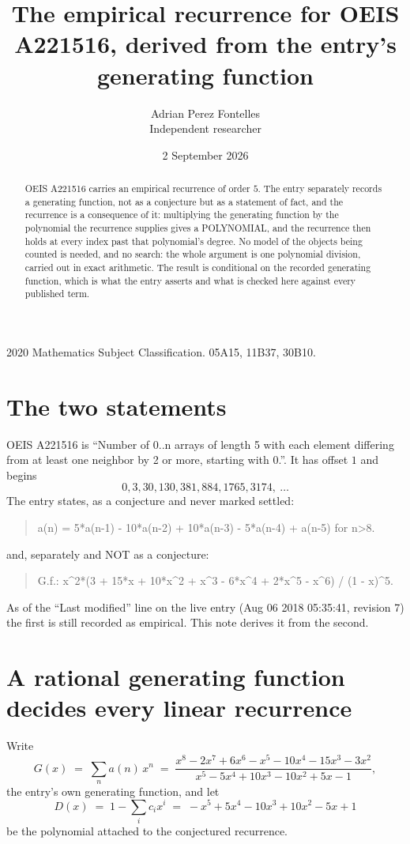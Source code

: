 \documentclass[11pt,a4paper]{article}
\title{The empirical recurrence for OEIS A221516, derived from the entry's generating function}
\author{Adrian Perez Fontelles\\ \small Independent researcher}
\date{2 September 2026}
\theoremstyle{plain}
\theoremstyle{definition}
\begin{document}
\maketitle

\begin{abstract}
OEIS A221516 carries an empirical recurrence of order $5$. The entry separately records a
generating function, not as a conjecture but as a statement of fact, and the recurrence is a
consequence of it: multiplying the generating function by the polynomial the recurrence
supplies gives a POLYNOMIAL, and the recurrence then holds at every index past that
polynomial's degree. No model of the objects being counted is needed, and no search: the
whole argument is one polynomial division, carried out in exact arithmetic. The result is
conditional on the recorded generating function, which is what the entry asserts and what is
checked here against every published term.
\end{abstract}

\noindent\small 2020 Mathematics Subject Classification. 05A15, 11B37, 30B10.\normalsize

\section{The two statements}

OEIS A221516 is ``Number of 0..n arrays of length 5 with each element differing from at least one neighbor by 2 or more, starting with 0.''. It has offset $1$ and begins
\[
0, 3, 30, 130, 381, 884, 1765, 3174,\ \dots
\]
The entry states, as a conjecture and never marked settled:
\begin{quote}
a(n) = 5*a(n-1) - 10*a(n-2) + 10*a(n-3) - 5*a(n-4) + a(n-5) for n>8.
\end{quote}
and, separately and NOT as a conjecture:
\begin{quote}
G.f.: x\^{}2*(3 + 15*x + 10*x\^{}2 + x\^{}3 - 6*x\^{}4 + 2*x\^{}5 - x\^{}6) / (1 - x)\^{}5.
\end{quote}
As of the ``Last modified'' line on the live entry (Aug 06 2018 05:35:41, revision 7) the first is still
recorded as empirical. This note derives it from the second.

\section{A rational generating function decides every linear recurrence}

Write
\[
G(x)\;=\;\sum_{n}a(n)\,x^{n}\;=\;\frac{x^{8} - 2 x^{7} + 6 x^{6} - x^{5} - 10 x^{4} - 15 x^{3} - 3 x^{2}}{x^{5} - 5 x^{4} + 10 x^{3} - 10 x^{2} + 5 x - 1},
\]
the entry's own generating function, and let
\[
D(x)\;=\;1-\sum_i c_i x^{i}\;=\;- x^{5} + 5 x^{4} - 10 x^{3} + 10 x^{2} - 5 x + 1
\]
be the polynomial attached to the conjectured recurrence.
\end{document}
